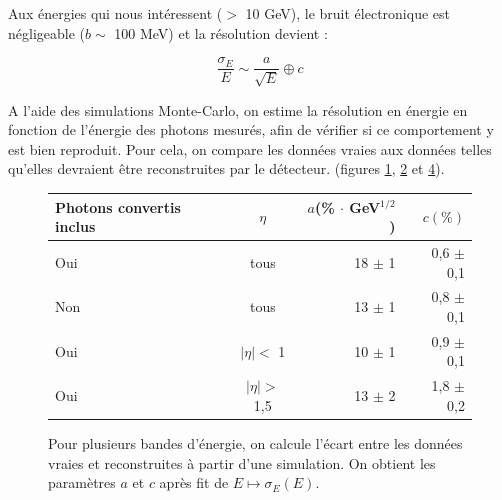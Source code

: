 \documentclass[11pt]{article} %
\begin{document}
Aux énergies qui nous intéressent ($>$ 10 GeV), le bruit électronique est négligeable ($b \sim$ 100 MeV) et la résolution devient :

\begin{equation}
\dfrac{\sigma_E}{E} \sim \dfrac{a}{\sqrt{E}} \oplus c
\end{equation}

A l'aide des simulations Monte-Carlo, on estime la résolution en énergie en fonction de l'énergie des photons mesurés, afin de vérifier si ce comportement y est bien reproduit. Pour cela, on compare les données vraies aux données telles qu'elles devraient être reconstruites par le détecteur. (figures \ref{fig:resolution_energie_photons_tab}, \ref{fig:resolution_energie_photons} et \ref{fig:resolution_energie_photons2}).

\begin{figure}[H]
\centering
\begin{tabular}{|l|c|r|r|} 
   \hline
   Photons convertis inclus &$\eta$ & $a$(\% $\cdot$ GeV${ }^{1/2}$) & $c (\%)$ \\
    \hline
   Oui & tous & 18  $\pm$ 1  &0,6  $\pm$ 0,1  \\
  \hline
   Non & tous & 13  $\pm$ 1  &0,8  $\pm$ 0,1  \\
  \hline
   Oui &$|\eta| < $ 1 & 10  $\pm$ 1  &0,9  $\pm$ 0,1  \\
\hline
   Oui & $|\eta| >$ 1,5 & 13  $\pm$ 2  &1,8  $\pm$ 0,2  \\
\hline
\end{tabular}
\caption{ Pour plusieurs bandes d'énergie, on calcule l'écart entre les données vraies et reconstruites à partir d'une simulation. On obtient les paramètres $a$ et $c$ après fit de $E \mapsto \sigma_E(E)$.  }
\label{fig:resolution_energie_photons_tab} 
\end{figure}

\begin{figure}[H]
\begin{subfigure}[b]{.5\linewidth}
\centering
\label{fig:resolution_energie_photons} 
 \resizebox{1.1\linewidth}{!}{}
\end{subfigure}%
\begin{subfigure}[b]{.5\linewidth}
\centering
\label{fig:resolution_energie_photons2} 
 \resizebox{1.1\linewidth}{!}{}
\end{subfigure}
\end{figure}
\end{document}
